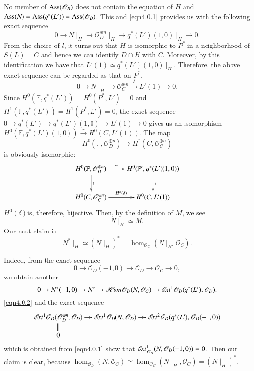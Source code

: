 \begin{Proof}
No member of $\mathrm{Ass}(\mathscr{O}_D)$ does not contain the equation of $H$
and $\mathrm{Ass}(N)=\mathrm{Ass}(q^{\ast}(L'))=\mathrm{Ass}(\mathscr{O}_D)$. This and
\eqref{eqn4.0.1} provides us with the following exact sequence 
$$
0\to N\mid_{H}\to \mathscr{O}_{D}^{\oplus n}\mid_H\to
q^{\ast}(L')(1,0)\mid_{H}\to 0.
$$
From the choice of $l$, it turns out that $H$ is isomorphic to
$P^{\ast}$ in a neighborhood of $S(L)=C$ and hence we can identify
$D\cap H$ with $C$. Moreover, by this identification we have that
$L'(1)\simeq q^{\ast}(L')(1,0)\mid_H$. Therefore, the above exact
sequence can be regarded as that on $P^{\ast}$.
\setcounter{equation}{1}
\begin{equation}\label{eqn4.6.2}
0\to N\mid_H\to \mathscr{O}_{C}^{\oplus n}\xrightarrow{\delta}L'(1)\to 0.
\end{equation}
Since $H^{0}(\mathbb{F},q^{\ast}(L'))=H^{0}(P^{\ast},L')=0$ and
$H^{1}(\mathbb{F},q^{\ast}(L'))=H^{1}(P^{\ast},L')=0$, the exact
sequence $0\to q^{\ast}(L')\to q^{\ast}(L')(1,0)\to L'(1)\to 0$ gives
us an isomorphism $H^{0}(\mathbb{F},
q^{\ast}(L')(1,0))\xrightarrow{\sim}H^{0}(C,L'(1))$. The  map
$$
H^{0}(\mathbb{F},\mathscr{O}^{\oplus n}_D)\to
H^{\ast}(C,\mathscr{O}^{\oplus n}_C)
$$ 
is obviously isomorphic: 
$$
\xymatrix{H^{0}(\mathbb{F},\mathscr{O}^{\oplus
    n}_D)\ar[d]^{\wr}\ar[r]^-{\sim}&H^{0}(\mathbb{F}',q^{\ast}(L')(1,0))\ar[d]^{\wr}\\
H^{0}(C,\mathscr{O}^{\oplus n}_C)\ar[r]^-{H^{o}(\delta)}&H^{0}(C,L'(1))}
$$
$H^{0}(\delta)$\pageoriginale is, therefore, bijective. Then, by the
definition of $M$, we see 
\begin{equation}\label{eqn4.6.3}
N\mid_H\simeq M.
\end{equation}
Our next claim is 
\begin{equation}\label{eqn4.6.4}
N^{\ast}\mid_{H}\simeq
(N\mid_H)^{\ast}=\hom_{\mathscr{O}_C}(N\mid_{H'}\mathscr{O}_C). 
\end{equation}

Indeed, from the exact sequence 
$$
0\to \mathscr{O}_D(-1,0)\to \mathscr{O}_D\to \mathscr{O}_C\to 0,
$$
we obtain another 
$$
0\to N^{\ast}(-1,0)\to N^{\ast}\to
\mathscr{H}\!{\it om}\mathscr{O}_D(N,\mathscr{O}_C)\to \mathscr{E}\!{\it xt}^{1}\mathscr{O}_D(q^{\ast}(L'),\mathscr{O}_D).
$$
\eqref{eqn4.0.2} and the exact sequence 
$$
\xymatrix@=.4cm{\ext^{1}\mathscr{O}_D(\mathscr{O}^{\oplus
    n}_D,\mathscr{O}_{D})\ar@{=}[d]\ar[r]&\ext^{1}\mathscr{O}_D(N,\mathscr{O}_D)\ar[r]&\ext^{2}\mathscr{O}_D(q^{\ast}(L'),\mathscr{O}_D(-1,0))\\
0}
$$
which is obtained from \eqref{eqn4.0.1} show that
$\mathscr{E}\!{\it xt}^{1}_{\mathscr{O}_D}(N,\mathscr{O}_D(-1,0))=0$. Then our claim is
clear, because $\hom_{\mathscr{O}_D}(N,\mathscr{O}_C)\simeq
\hom_{\mathscr{O}_C}(N\mid_H,\mathscr{O}_C)=(N\mid_H)^{\ast}$. 


\end{Proof}

